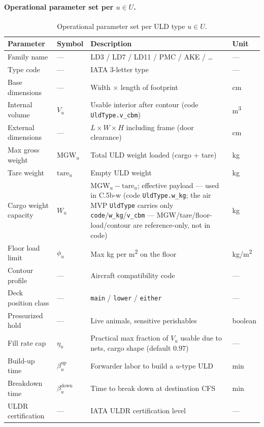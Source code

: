 \documentclass[11pt,a4paper]{article}
\theoremstyle{definition}
\begin{document}
\paragraph{Operational parameter set per $u \in U$.}
\begin{table}[H]
\centering
\caption{Operational parameter set per ULD type $u \in U$.}
\label{tab:uld-params}
\begin{tabular}{p{3cm}p{2.2cm}p{7cm}p{1.5cm}}
\toprule
Parameter & Symbol & Description & Unit \\
\midrule
Family name & --- & LD3 / LD7 / LD11 / PMC / AKE / \ldots & --- \\
Type code & --- & IATA 3-letter type & --- \\
Base dimensions & --- & Width $\times$ length of footprint & cm \\
Internal volume & $V_u$ & Usable interior after contour (code \texttt{UldType.v\_cbm}) & m\textsuperscript{3} \\
External dimensions & --- & $L \times W \times H$ including frame (door clearance) & cm \\
Max gross weight & $\text{MGW}_u$ & Total ULD weight loaded (cargo + tare) & kg \\
Tare weight & $\text{tare}_u$ & Empty ULD weight & kg \\
Cargo weight capacity & $W_u$ & $\text{MGW}_u - \text{tare}_u$; effective payload --- used in C.5b-w (code \texttt{UldType.w\_kg}; the air MVP \texttt{UldType} carries only \texttt{code}/\texttt{w\_kg}/\texttt{v\_cbm} --- MGW/tare/floor-load/contour are reference-only, not in code) & kg \\
Floor load limit & $\phi_u$ & Max kg per m\textsuperscript{2} on the floor & kg/m\textsuperscript{2} \\
Contour profile & --- & Aircraft compatibility code & --- \\
Deck position class & --- & \texttt{main} / \texttt{lower} / \texttt{either} & --- \\
Pressurized hold & --- & Live animals, sensitive perishables & boolean \\
Fill rate cap & $\eta_u$ & Practical max fraction of $V_u$ usable due to nets, cargo shape (default $0.97$) & --- \\
Build-up time & $\beta_u^{\text{up}}$ & Forwarder labor to build a $u$-type ULD & min \\
Breakdown time & $\beta_u^{\text{down}}$ & Time to break down at destination CFS & min \\
ULDR certification & --- & IATA ULDR certification level & --- \\
\bottomrule
\end{tabular}
\end{table}
\end{document}
